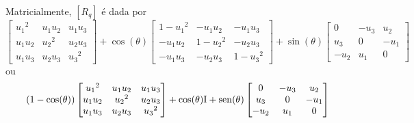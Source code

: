 
Matricialmente, $[R_q]$ é dada por
	\begin{equation*}
	\begin{bmatrix}
			{u_1}^2 & u_1u_2 & u_1u_3 \\ 
			u_1u_2 & {u_2}^2 & u_2u_3 \\ 
			u_1u_3 & u_2u_3 & {u_3}^2
	\end{bmatrix}
	+\cos(\theta)
	\begin{bmatrix}
		1-{u_1}^2 & -u_1u_2 & -u_1u_3 \\ 
		-u_1u_2 & 1-{u_2}^2 & -u_2u_3 \\ 
		-u_1u_3 & -u_2u_3 & 1-{u_3}^2
	\end{bmatrix}
	+ \sin(\theta)
	\begin{bmatrix}
			0 & -u_3 & u_2 \\ 
			u_3 & 0 & -u_1 \\ 
			-u_2 & u_1 & 0
	\end{bmatrix}
	\end{equation*}
ou
	\begin{equation*}
	(1-\cos(\theta))
	\begin{bmatrix}
			{u_1}^2 & u_1u_2 & u_1u_3 \\ 
			u_1u_2 & {u_2}^2 & u_2u_3 \\ 
			u_1u_3 & u_2u_3 & {u_3}^2
	\end{bmatrix}
	+
	\cos(\theta)\mathrm{I} + \operatorname{sen}(\theta)
	\begin{bmatrix}
			0 & -u_3 & u_2 \\ 
			u_3 & 0 & -u_1 \\ 
			-u_2 & u_1 & 0
	\end{bmatrix}
	\end{equation*}